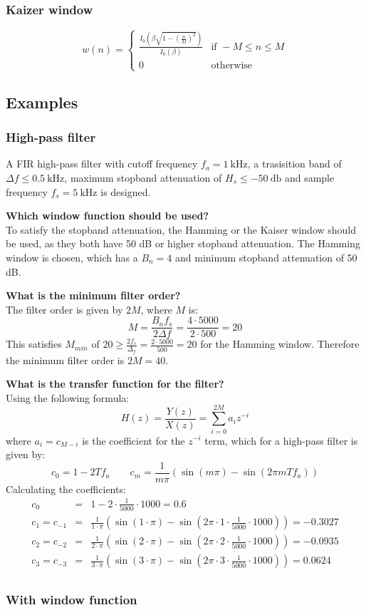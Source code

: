 \subsubsection{Kaizer window}
$$w(n)=\begin{cases}
  \frac{I_0\left(\beta\sqrt{1-\left(\frac{n}{M}\right)^{2}}\right)}{I_0(\beta)}& \text{if } -M\leq n\leq M\\
0 & \text{otherwise}
\end{cases}$$

\subsection{Examples}
\subsubsection{High-pass filter}
A FIR high-pass filter with cutoff frequency $f_{a}=\SI{1}{\kilo\hertz}$, a trasisition band of $\Delta f\leq\SI{0.5}{\kilo\hertz}$, maximum stopband attenuation of $H_s\leq\SI{-50}{\decibel}$ and sample frequency $f_s=\SI{5}{\kilo\hertz}$ is designed.

\textbf{Which window function should be used?}\\
To satisfy the stopband attenuation, the Hamming or the Kaiser window should be used, as they both have 50 dB or higher stopband attenuation.
The Hamming window is chosen, which has a $B_n=4$ and minimum stopband attenuation of 50 dB.

\textbf{What is the minimum filter order?}\\
The filter order is given by $2M$, where $M$ is:
$$M=\frac{B_nf_s}{2\Delta f}=\frac{4\cdot5000}{2\cdot 500}=20$$
This satisfies $M_{min}$ of $20\geq\frac{2f_s}{\Delta_f}=\frac{2\cdot5000}{500}=20$ for the Hamming window.
Therefore the minimum filter order is $2M=40$.

\textbf{What is the transfer function for the filter?}\\
Using the following formula:
$$H(z)=\frac{Y(z)}{X(z)}=\sum_{i=0}^{2M}a_iz^{-i}$$
where $a_i=c_{M-i}$ is the coefficient for the $z^{-i}$ term, which for a high-pass filter is given by:
$$c_0=1-2Tf_a\qquad c_m=\frac{1}{m\pi}(\sin(m\pi)-\sin(2\pi m T f_{a}))$$
Calculating the coefficients:
\begin{eqnarray*}
c_0&=&1-2\cdot\frac{1}{5000}\cdot1000=0.6\\
c_1=c_{-1}&=&\frac{1}{1\cdot\pi}\left(\sin(1\cdot\pi)-\sin(2\pi\cdot 1\cdot\frac{1}{5000}\cdot1000)\right)=-0.3027\\
c_2=c_{-2}&=&\frac{1}{2\cdot\pi}\left(\sin(2\cdot\pi)-\sin(2\pi\cdot 2\cdot\frac{1}{5000}\cdot1000)\right)=-0.0935\\
c_3=c_{-3}&=&\frac{1}{3\cdot\pi}\left(\sin(3\cdot\pi)-\sin(2\pi\cdot 3\cdot\frac{1}{5000}\cdot1000)\right)=0.0624\\
\end{eqnarray*}
\subsubsection{With window function}
